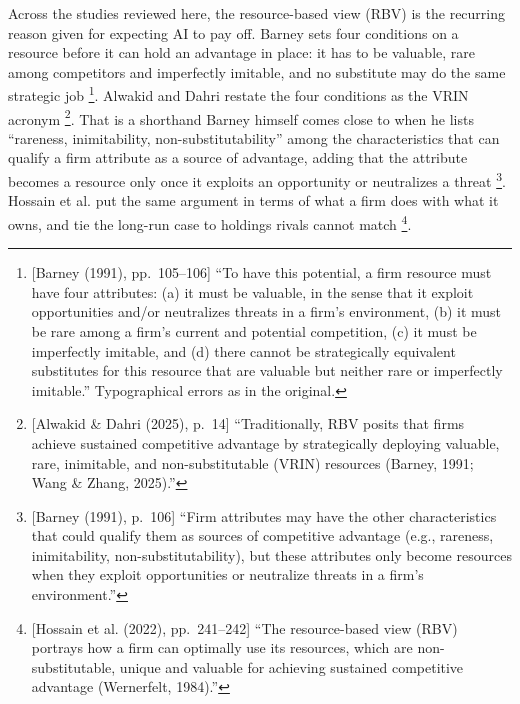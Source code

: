 Across the studies reviewed here, the resource-based view (RBV) is the recurring reason
given for expecting AI to pay off. Barney sets four conditions on a resource before it
can hold an advantage in place: it has to be valuable, rare among competitors and
imperfectly imitable, and no substitute may do the same strategic
job \parencite[pp.~105--106]{barney1991firm}\footnote{[Barney (1991), pp.~105--106] ``To
have this potential, a firm resource must have four attributes: (a) it must be valuable,
in the sense that it exploit opportunities and/or neutralizes threats in a firm's
environment, (b) it must be rare among a firm's current and potential competition, (c) it
must be imperfectly imitable, and (d) there cannot be strategically equivalent substitutes
for this resource that are valuable but neither rare or imperfectly imitable.''
Typographical errors as in the original.}. Alwakid and Dahri restate the four conditions
as the VRIN
acronym \parencite[p.~14]{alwakid2025harnessing}\footnote{[Alwakid \& Dahri (2025), p.~14]
``Traditionally, RBV posits that firms achieve sustained competitive advantage by
strategically deploying valuable, rare, inimitable, and non-substitutable (VRIN)
resources (Barney, 1991; Wang \& Zhang, 2025).''}. That is a shorthand Barney himself comes close
to when he lists ``rareness, inimitability, non-substitutability'' among the
characteristics that can qualify a firm attribute as a source of advantage, adding that
the attribute becomes a resource only once it exploits an opportunity or neutralizes a
threat \parencite[p.~106]{barney1991firm}\footnote{[Barney (1991), p.~106] ``Firm
attributes may have the other characteristics that could qualify them as sources of
competitive advantage (e.g., rareness, inimitability, non-substitutability), but these
attributes only become resources when they exploit opportunities or neutralize threats in
a firm's environment.''}. Hossain et al. put the same argument
in terms of what a firm does with what it owns, and tie the long-run case to holdings
rivals cannot match \parencite[pp.~241--242]{hossain2022marketing}\footnote{[Hossain
et al. (2022), pp.~241--242] ``The resource-based view (RBV) portrays how a firm can
optimally use its resources, which are non-substitutable, unique and valuable for
achieving sustained competitive advantage (Wernerfelt, 1984).''}.


